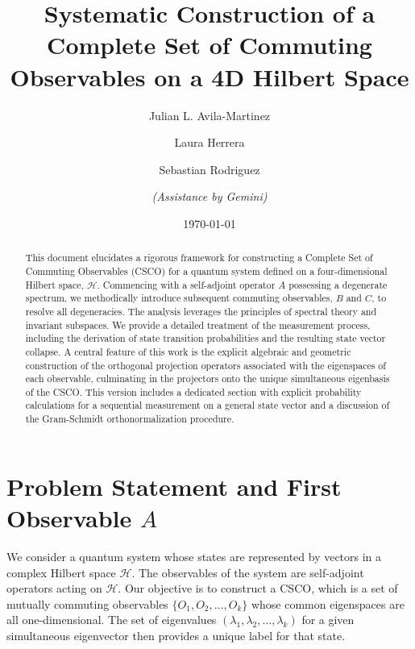 \documentclass[11pt,a4paper]{article}
\title{Systematic Construction of a Complete Set of Commuting Observables on a
4D Hilbert Space}
\author{Julian L. Avila-Martinez \and Laura Herrera \and Sebastian Rodriguez \\ \and
\textit{(Assistance by Gemini)}}
\date{\today}
\begin{document}
\maketitle

\begin{abstract}
  This document elucidates a rigorous framework for constructing a Complete Set of
  Commuting Observables (CSCO) for a quantum system defined on a four-dimensional
  Hilbert space, $\mathcal{H}$. Commencing with a self-adjoint operator $A$
  possessing a degenerate spectrum, we methodically introduce subsequent commuting
  observables, $B$ and $C$, to resolve all degeneracies. The analysis leverages
  the principles of spectral theory and invariant subspaces. We provide a detailed
  treatment of the measurement process, including the derivation of state
  transition probabilities and the resulting state vector collapse. A central
  feature of this work is the explicit algebraic and geometric construction of the
  orthogonal projection operators associated with the eigenspaces of each
  observable, culminating in the projectors onto the unique simultaneous
  eigenbasis of the CSCO. This version includes a dedicated section with explicit
  probability calculations for a sequential measurement on a general state vector
  and a discussion of the Gram-Schmidt orthonormalization procedure.
\end{abstract}

\section{Problem Statement and First Observable \texorpdfstring{$A$}{A}}

We consider a quantum system whose states are represented by vectors in a
complex Hilbert space $\mathcal{H}$. The observables of the system are
self-adjoint operators acting on $\mathcal{H}$. Our objective is to construct a
CSCO, which is a set of mutually commuting observables $\{O_1, O_2, \dots,
O_k\}$ whose common eigenspaces are all one-dimensional. The set of eigenvalues
$(\lambda_1, \lambda_2, \dots, \lambda_k)$ for a given simultaneous eigenvector
then provides a unique label for that state.
\end{document}
